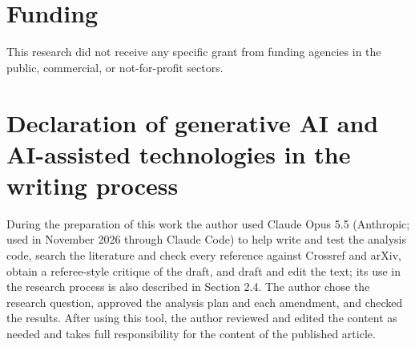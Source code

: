 \documentclass[preprint,12pt,authoryear]{elsarticle}
\begin{document}
\section*{Funding}
This research did not receive any specific grant from funding agencies in the public, commercial, or not-for-profit sectors.

\section*{Declaration of generative AI and AI-assisted technologies in the writing process}
During the preparation of this work the author used Claude Opus 5.5 (Anthropic; used in November 2026 through Claude Code) to help write and test the analysis code, search the literature and check every reference against Crossref and arXiv, obtain a referee-style critique of the draft, and draft and edit the text; its use in the research process is also described in Section 2.4. The author chose the research question, approved the analysis plan and each amendment, and checked the results. After using this tool, the author reviewed and edited the content as needed and takes full responsibility for the content of the published article.



\end{document}
